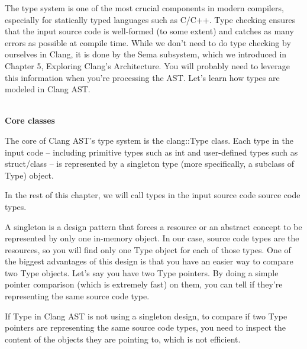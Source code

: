 
The type system is one of the most crucial components in modern compilers, especially for statically typed languages such as C/C++. Type checking ensures that the input source code is well-formed (to some extent) and catches as many errors as possible at compile time. While we don't need to do type checking by ourselves in Clang, it is done by the Sema subsystem, which we introduced in Chapter 5, Exploring Clang's Architecture. You will probably need to leverage this information when you're processing the AST. Let's learn how types are modeled in Clang AST.

\hspace*{\fill} \\ %
\noindent
\textbf{Core classes}

The core of Clang AST's type system is the clang::Type class. Each type in the input code – including primitive types such as int and user-defined types such as struct/class – is represented by a singleton type (more specifically, a subclass of Type) object.

\begin{tcolorbox}[colback=blue!5!white,colframe=blue!75!black, fonttitle=\bfseries,title=Terminology]
\hspace*{0.7cm}In the rest of this chapter, we will call types in the input source code source code types.
\end{tcolorbox}

A singleton is a design pattern that forces a resource or an abstract concept to be represented by only one in-memory object. In our case, source code types are the resources, so you will find only one Type object for each of those types. One of the biggest advantages of this design is that you have an easier way to compare two Type objects. Let's say you have two Type pointers. By doing a simple pointer comparison (which is extremely fast) on them, you can tell if they're representing the same source code type.

\begin{tcolorbox}[colback=blue!5!white,colframe=blue!75!black, fonttitle=\bfseries,title=Counter Example of a Singleton Design]
\hspace*{0.7cm}If Type in Clang AST is not using a singleton design, to compare if two Type pointers are representing the same source code types, you need to inspect the content of the objects they are pointing to, which is not efficient.
\end{tcolorbox}

